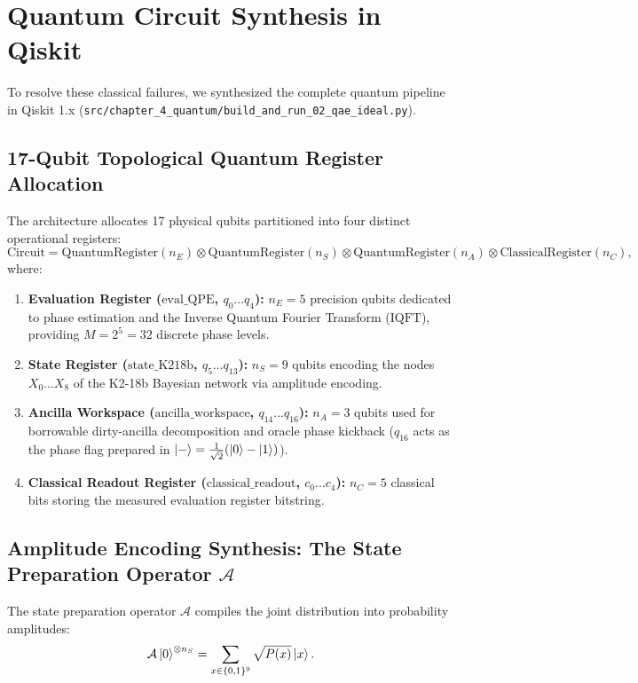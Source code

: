 \section{Quantum Circuit Synthesis in Qiskit}\label{sec:quantum_circuit_synthesis}

To resolve these classical failures, we synthesized the complete quantum pipeline in Qiskit 1.x (\texttt{src/chapter\_4\_quantum/build\_and\_run\_02\_qae\_ideal.py}).

\subsection{17-Qubit Topological Quantum Register Allocation}
The architecture allocates 17 physical qubits partitioned into four distinct operational registers:
\begin{equation}
\mathrm{Circuit} = \mathrm{QuantumRegister}(n_E) \otimes \mathrm{QuantumRegister}(n_S) \otimes \mathrm{QuantumRegister}(n_A) \otimes \mathrm{ClassicalRegister}(n_C),
\label{eq:17qubit_register_allocation}
\end{equation}
where:
\begin{enumerate}
    \item \textbf{Evaluation Register ($\mathrm{eval\_QPE}$, $q_0 \dots q_4$):} $n_E = 5$ precision qubits dedicated to phase estimation and the Inverse Quantum Fourier Transform ($\mathrm{IQFT}$), providing $M = 2^5 = 32$ discrete phase levels.
    \item \textbf{State Register ($\mathrm{state\_K218b}$, $q_5 \dots q_{13}$):} $n_S = 9$ qubits encoding the nodes $X_0 \dots X_8$ of the K2-18b Bayesian network via amplitude encoding.
    \item \textbf{Ancilla Workspace ($\mathrm{ancilla\_workspace}$, $q_{14} \dots q_{16}$):} $n_A = 3$ qubits used for borrowable dirty-ancilla decomposition and oracle phase kickback ($q_{16}$ acts as the phase flag prepared in $\left|-\right\rangle = \frac{1}{\sqrt{2}}(\left|0\right\rangle-\left|1\right\rangle)$).
    \item \textbf{Classical Readout Register ($\mathrm{classical\_readout}$, $c_0 \dots c_4$):} $n_C = 5$ classical bits storing the measured evaluation register bitstring.
\end{enumerate}

\subsection{Amplitude Encoding Synthesis: The State Preparation Operator \texorpdfstring{$\mathcal{A}$}{A}}
The state preparation operator $\mathcal{A}$ compiles the joint distribution into probability amplitudes:
\begin{equation}
\mathcal{A}\left|0\right\rangle^{\otimes n_S} = \sum_{x \in \{0,1\}^9} \sqrt{P(x)} \left|x\right\rangle.
\label{eq:amplitude_prep_state_ch4}
\end{equation}

